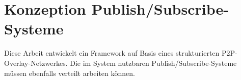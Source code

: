 \chapter{Konzeption Publish/Subscribe-Systeme}
\label{chap:konzeption_pubsub}
Diese Arbeit entwickelt ein Framework auf Basis eines strukturierten P2P-Overlay-Netzwerkes. Die im System nutzbaren Publish/Subscribe-Systeme müssen ebenfalls verteilt arbeiten können.


\cite{BeFiMu2006PubSubQoS}

\cite{PiEyKoSh2007-PubSubAPI}

\cite{KostasKatrinis2005}
